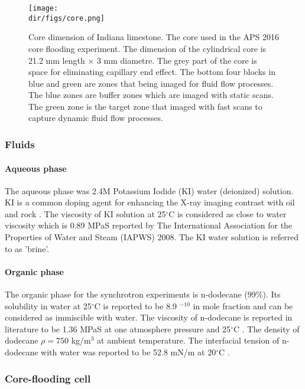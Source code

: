 \begin{figure}[htbp]
  \centering
  \texttt{[image: \\dir/figs/core.png]}
  \caption{Core dimension of Indiana limestone. The core used in the APS 2016 core flooding experiment. The dimension of the cylindrical core is 21.2 mm length $\times$ 3 mm diametre. The grey part of the core is space for eliminating capillary end effect. The bottom four blocks in blue and green are zones that being imaged for fluid flow processes. The blue zones are buffer zones which are imaged with static scans. The green zone is the target zone that imaged with fast scans to capture dynamic fluid flow processes.} 
  \label{core} 
\end{figure}

\subsubsection{Fluids}
\paragraph{Aqueous phase}
The aqueous phase was 2.4M Potassium Iodide (KI) water (deionized) solution. KI is a common doping agent for enhancing the X-ray imaging contrast with oil and rock \citep[e.g.]{iglauer2011residual,culligan2006pore,porter2010measurement}. The viscosity of KI solution at 25$^{\circ}$C is considered as close to water viscosity which is 0.89 MPaS reported by The International Association for the Properties of Water and Steam (IAPWS) 2008. The KI water solution is referred to as 'brine'.

\paragraph{Organic phase}
The organic phase for the synchrotron experiments is n-dodecane (99\%). Its solubility in water at 25$^{\circ}$C is reported to be 8.9 $^{-10}$ in mole fraction \citep{shaw2006iupac} and can be considered as immiscible with water. The viscosity of n-dodecane is reported in literature to be 1.36 MPaS at one atmosphere pressure and 25$^{\circ}$C \citep{liu2011measurement}. The density of dodecane $\rho=750$ kg/m$^3$ at ambient temperature. The interfacial tension of n-dodecane with water was reported to be 52.8 mN/m at 20$^{\circ}$C \citep{zeppieri2001interfacial}.

\subsubsection{Core-flooding cell}
